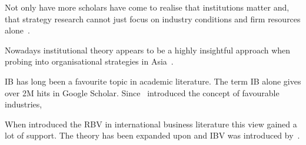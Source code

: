 Not only have more scholars have come to realise that institutions matter and, that strategy research cannot just focus on industry conditions and firm resources alone~\cite{Powell:1991,Scott:1995}.

Nowadays institutional theory appears to be a highly insightful approach when probing into organisational strategies in Asia~\cite{Hoskisson:2000}.

\Gls{IB} has long been a favourite topic in academic literature. The term \gls{IB} alone gives over 2M hits in Google Scholar. Since~\cite{Porter:1980} introduced the concept of favourable industries, 

When introduced the \gls{RBV} in international business literature this view gained a lot of support. 
The theory has been expanded upon and \gls{IBV} was introduced by~\cite{Kostova:1999,Meyer:2009,Wang:2012}.


\section{}


